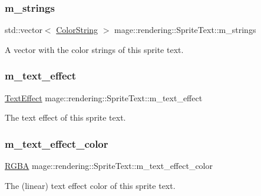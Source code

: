 \subsubsection{\texorpdfstring{m\+\_\+strings}{m\_strings}}
{\footnotesize\ttfamily std\+::vector$<$ \mbox{\hyperlink{classmage_1_1rendering_1_1_color_string}{Color\+String}} $>$ mage\+::rendering\+::\+Sprite\+Text\+::m\+\_\+strings\hspace{0.3cm}{\ttfamily [private]}}

A vector with the color strings of this sprite text. \mbox{\label{classmage_1_1rendering_1_1_sprite_text_a795a35dc3671097dd29afaa4b2c5ac3a}} 
\subsubsection{\texorpdfstring{m\+\_\+text\+\_\+effect}{m\_text\_effect}}
{\footnotesize\ttfamily \mbox{\hyperlink{classmage_1_1rendering_1_1_sprite_text_af07ecf28d2ab8997c011cab74e799ef7}{Text\+Effect}} mage\+::rendering\+::\+Sprite\+Text\+::m\+\_\+text\+\_\+effect\hspace{0.3cm}{\ttfamily [private]}}

The text effect of this sprite text. \mbox{\label{classmage_1_1rendering_1_1_sprite_text_a2fffa5ce343b92f32cbfe5234b182247}} 
\subsubsection{\texorpdfstring{m\+\_\+text\+\_\+effect\+\_\+color}{m\_text\_effect\_color}}
{\footnotesize\ttfamily \mbox{\hyperlink{structmage_1_1_r_g_b_a}{R\+G\+BA}} mage\+::rendering\+::\+Sprite\+Text\+::m\+\_\+text\+\_\+effect\+\_\+color\hspace{0.3cm}{\ttfamily [private]}}

The (linear) text effect color of this sprite text. 